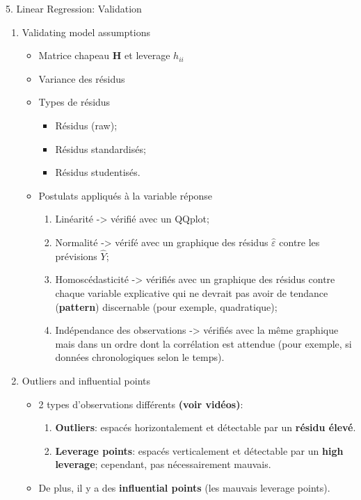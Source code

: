 \documentclass[12pt, titlepage, french]{report}
\begin{document}
\begin{CHPT_SUMM}[label = {VALID-VALID}]{5. Linear Regression:  Validation}
\begin{enumerate}
	\item	Validating model assumptions
	\begin{itemize}
		\item	Matrice chapeau $\bm{H}$ et leverage $h_{ii}$
		\item	Variance des résidus
		\item	Types de résidus
		\begin{itemize}
			\item	Résidus (raw);
			\item	Résidus standardisés;
			\item	Résidus studentisés.
		\end{itemize}
		\item	Postulats appliqués à la variable réponse
		\begin{enumerate}
			\item	Linéarité -> vérifié avec un QQplot;
			\item	Normalité -> vérifé avec un graphique des résidus $\hat{\varepsilon}$ contre les prévisions $\hat{Y}$;
			\item	Homoscédasticité -> vérifiés avec un graphique des résidus contre chaque variable explicative qui ne devrait pas avoir de tendance (\textbf{pattern}) discernable (pour exemple, quadratique);
			\item	Indépendance des observations -> vérifiés avec la même graphique mais dans un ordre dont la corrélation est attendue (pour exemple, si données chronologiques selon le temps).
		\end{enumerate}
	\end{itemize}
	\item	Outliers and influential points
	\begin{itemize}
		\item	2 types d'observations différents \textbf{(voir vidéos)}:
		\begin{enumerate}
			\item	\textbf{Outliers}: espacés horizontalement et détectable par un \textbf{résidu élevé}.
			\item	\textbf{Leverage points}: espacés verticalement et détectable par un \textbf{high leverage}; cependant, pas nécessairement mauvais.
		\end{enumerate}
		\item	De plus, il y a des \textbf{influential points} (les mauvais leverage points).

\end{itemize}
\end{enumerate}
\end{CHPT_SUMM}
\end{document}
